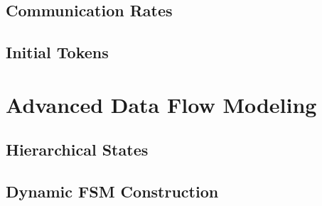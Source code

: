 \subsection{Communication Rates}

\subsection{Initial Tokens}


\section{Advanced Data Flow Modeling}
\subsection{Hierarchical States}

\subsection{Dynamic FSM Construction}


%
%
%
%
%
%
%


